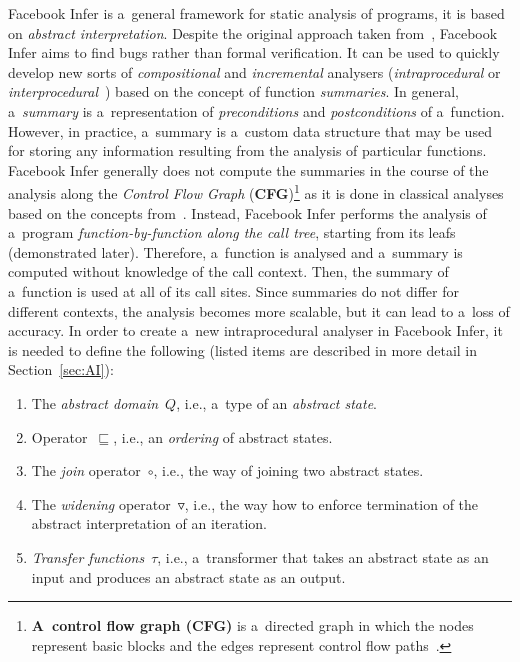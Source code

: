 Facebook Infer is a~general framework for static analysis of programs, it is
based on \emph{abstract interpretation}. Despite the original approach
taken from~\cite{inferBiabduction}, Facebook Infer  aims to find bugs rather
than formal verification. It can be used to quickly develop new sorts of
\emph{compositional} and \emph{incremental} analysers (\emph{intraprocedural}
or \emph{interprocedural}~\cite{programAnalysisNielson}) based
on the concept of function \emph{summaries}. In general, a~\emph{summary}
is a~representation of \emph{preconditions} and \emph{postconditions} of
a~function. However, in practice, a~summary is a~custom data structure that
may be used for storing any information resulting from the analysis of
particular functions. Facebook Infer generally does not compute the summaries
in the course of the analysis along the \emph{Control Flow Graph}
(\textbf{CFG})\footnote{\textbf{A~control flow graph (CFG)} is a~directed
graph in which the nodes represent basic blocks and the edges represent control
flow paths~\cite{controlFlowAnalysisAllen}.} as it is done in classical
analyses based on the concepts from~\cite{dataflowAnalysisGraphReachability,
dataflowAnalysisApproaches}. Instead, Facebook Infer performs the
analysis of a~program \emph{function-by-function along the call tree},
starting from its leafs (demonstrated later). Therefore, a~function
is analysed and a~summary is computed without knowledge of the
call context. Then, the summary of a~function is used at all of its call
sites. Since summaries do not differ for different contexts, the analysis
becomes more scalable, but it can lead to a~loss of accuracy. In order
to create a~new intraprocedural analyser in Facebook Infer, it is needed to
define the following (listed items are described in more detail in
Section~\ref{sec:AI}):
\begin{enumerate}
    \item
        The \emph{abstract domain}~$ Q $, i.e., a~type of an
        \emph{abstract state}.

    \item
        Operator~$ \sqsubseteq $, i.e., an \emph{ordering} of abstract
        states.

    \item
        The \emph{join} operator~$ \circ $, i.e., the way of joining two
        abstract states.

    \item
        The \emph{widening} operator~$ \triangledown $, i.e., the way how to
        enforce termination of the abstract interpretation of an iteration.

    \item
        \emph{Transfer functions}~$ \tau $, i.e., a~transformer that
        takes an abstract state as an input and produces an abstract state
        as an output.
\end{enumerate}

